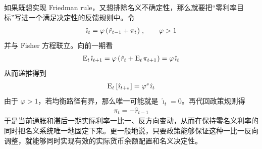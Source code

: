 \myskip
{}

如果既想实现 Friedman rule，又想排除名义不确定性，那么就要把“零利率目标”写进一个满足决定性的反馈规则中。令
\begin{align*}
    \hat\imath_t=\varphi\bka{\hat r_{t-1}+\pi_t}\,,\qquad \varphi>1
\end{align*}
并与 Fisher 方程联立。向前一期看
\begin{align*}
    \meant\,\hat\imath_{t+1}
    =\varphi\bka{\hat r_t+\meant\,\pi\nt}
    =\varphi\,\hat\imath_t
\end{align*}
从而递推得到
\begin{align*}
    \meant\bks{\hat\imath_{t+s}}=\varphi^s\,\hat\imath_t
\end{align*}
由于 \(\varphi>1\)，若均衡路径有界，那么唯一可能就是 \(\hat\imath_t=0\)。再代回政策规则得
\begin{align*}
    \pi_t=-\hat r_{t-1}
\end{align*}
于是当前通胀和滞后一期实际利率一比一、反方向变动，从而在保持零名义利率的同时把名义系统唯一地固定下来。更一般地说，只要政策能够保证这种一比一反向调整，就能够同时实现有效的实际货币余额配置和名义决定性。
